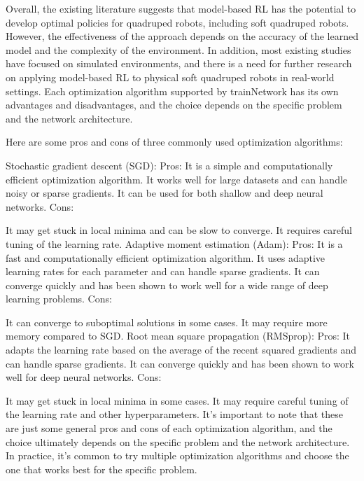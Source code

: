 Overall, the existing literature suggests that model-based RL has the potential to develop optimal policies for quadruped robots, including soft quadruped robots. However, the effectiveness of the approach depends on the accuracy of the learned model and the complexity of the environment. In addition, most existing studies have focused on simulated environments, and there is a need for further research on applying model-based RL to physical soft quadruped robots in real-world settings.
Each optimization algorithm supported by trainNetwork has its own advantages and disadvantages, and the choice depends on the specific problem and the network architecture. 

Here are some pros and cons of three commonly used optimization algorithms:

Stochastic gradient descent (SGD):
Pros:
It is a simple and computationally efficient optimization algorithm.
It works well for large datasets and can handle noisy or sparse gradients.
It can be used for both shallow and deep neural networks.
Cons:

It may get stuck in local minima and can be slow to converge.
It requires careful tuning of the learning rate.
Adaptive moment estimation (Adam):
Pros:
It is a fast and computationally efficient optimization algorithm.
It uses adaptive learning rates for each parameter and can handle sparse gradients.
It can converge quickly and has been shown to work well for a wide range of deep learning problems.
Cons:

It can converge to suboptimal solutions in some cases.
It may require more memory compared to SGD.
Root mean square propagation (RMSprop):
Pros:
It adapts the learning rate based on the average of the recent squared gradients and can handle sparse gradients.
It can converge quickly and has been shown to work well for deep neural networks.
Cons:

It may get stuck in local minima in some cases.
It may require careful tuning of the learning rate and other hyperparameters.
It's important to note that these are just some general pros and cons of each optimization algorithm, and the choice ultimately depends on the specific problem and the network architecture. In practice, it's common to try multiple optimization algorithms and choose the one that works best for the specific problem.

